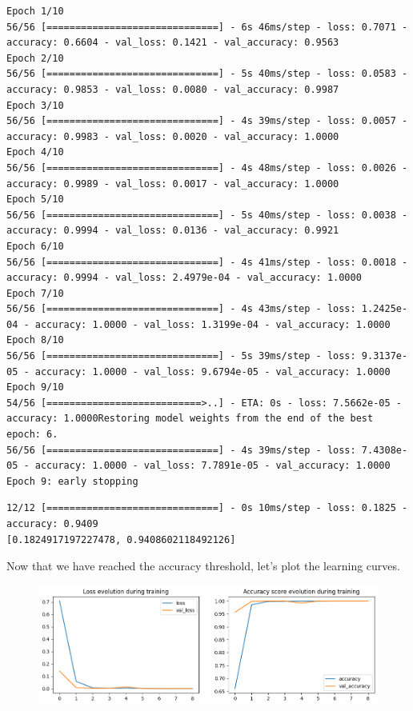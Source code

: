 \documentclass{article}
\begin{document}
\begin{lstlisting}[style=output]
Epoch 1/10
56/56 [==============================] - 6s 46ms/step - loss: 0.7071 - accuracy: 0.6604 - val_loss: 0.1421 - val_accuracy: 0.9563
Epoch 2/10
56/56 [==============================] - 5s 40ms/step - loss: 0.0583 - accuracy: 0.9853 - val_loss: 0.0080 - val_accuracy: 0.9987
Epoch 3/10
56/56 [==============================] - 4s 39ms/step - loss: 0.0057 - accuracy: 0.9983 - val_loss: 0.0020 - val_accuracy: 1.0000
Epoch 4/10
56/56 [==============================] - 4s 48ms/step - loss: 0.0026 - accuracy: 0.9989 - val_loss: 0.0017 - val_accuracy: 1.0000
Epoch 5/10
56/56 [==============================] - 5s 40ms/step - loss: 0.0038 - accuracy: 0.9994 - val_loss: 0.0136 - val_accuracy: 0.9921
Epoch 6/10
56/56 [==============================] - 4s 41ms/step - loss: 0.0018 - accuracy: 0.9994 - val_loss: 2.4979e-04 - val_accuracy: 1.0000
Epoch 7/10
56/56 [==============================] - 4s 43ms/step - loss: 1.2425e-04 - accuracy: 1.0000 - val_loss: 1.3199e-04 - val_accuracy: 1.0000
Epoch 8/10
56/56 [==============================] - 5s 39ms/step - loss: 9.3137e-05 - accuracy: 1.0000 - val_loss: 9.6794e-05 - val_accuracy: 1.0000
Epoch 9/10
54/56 [===========================>..] - ETA: 0s - loss: 7.5662e-05 - accuracy: 1.0000Restoring model weights from the end of the best epoch: 6.
56/56 [==============================] - 4s 39ms/step - loss: 7.4308e-05 - accuracy: 1.0000 - val_loss: 7.7891e-05 - val_accuracy: 1.0000
Epoch 9: early stopping
\end{lstlisting}



\begin{lstlisting}[style=output]
12/12 [==============================] - 0s 10ms/step - loss: 0.1825 - accuracy: 0.9409
[0.1824917197227478, 0.9408602118492126]
\end{lstlisting}

Now that we have reached the accuracy threshold, let's plot the learning curves.



\begin{figure}[h]
    \centering
    \includegraphics[scale = 0.48]{dl-figures/cnn-ex-1-learning-curves.png}
    \label{figure:cnn-ex-1-learning-curves}
\end{figure}
\end{document}
